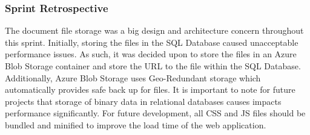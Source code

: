 \documentclass[11pt]{article}
\begin{document}
\subsubsection{Sprint Retrospective}
The document file storage was a big design and architecture concern throughout this sprint. Initially, storing the files in the SQL Database caused unacceptable performance issues. As such, it was decided upon to store the files in an Azure Blob Storage container and store the URL to the file within the SQL Database. Additionally, Azure Blob Storage uses Geo-Redundant storage which automatically provides safe back up for files. It is important to note for future projects that storage of binary data in relational databases causes impacts performance significantly. For future development, all CSS and JS files should be bundled and minified to improve the load time of the web application.
\end{document}
